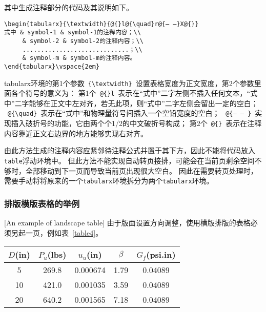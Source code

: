 其中生成注释部分的代码及其说明如下。
\vspace{1em}
\begin{lstlisting}
\begin{tabularx}{\textwidth}{@{}l@{\quad}r@{— —}X@{}}
式中 & symbol-1 & symbol-1的注释内容；\\
     & symbol-2 & symbol-2的注释内容；\\
     .............................；\\
     & symbol-m & symbol-m的注释内容。
\end{tabularx}\vspace{2em}
\end{lstlisting}


tabularx环境的第1个参数~\verb|{\textwidth}|~设置表格宽度为正文宽度，第2个参数里面各个符号的意义为：
    第1个~\verb|@{}l|~表示在“式中”二字左侧不插入任何文本，“式中”二字能够在正文中左对齐，若无此项，则“式中”二字左侧会留出一定的空白；
   ~\verb|@{\quad}|~表示在“式中”和物理量符号间插入一个空铅宽度的空白；
    ~\verb|@{— — }|~实现插入破折号的功能，它由两个个1/2的中文破折号构成；
    第2个~\verb|@{}|~表示在注释内容靠近正文右边界的地方能够实现右对齐。


由此方法生成的注释内容应紧邻待注释公式并置于其下方，因此不能将代码放入\verb|table|浮动环境中。
但此方法不能实现自动转页接排，可能会在当前页剩余空间不够时，全部移动到下一页而导致当前页出现很大空白。
因此在需要转页处理时，需要手动将将原来的一个\verb|tabularx|环境拆分为两个\verb|tabularx|环境。

\subsubsection{排版横版表格的举例}[An example of landscape table]
由于版面设置方向调整，使用横版排版的表格必须另起一页，例如表~\ref{table4}。

\begin{table}[p]
  \centering
  \begin{sideways}
    \begin{minipage}{\textheight}
      \vspace{0.5em}\centering\wuhao
      \begin{tabular}{ccccc}
        \toprule[1.5pt]
        $D$(in) & $P_u$(lbs) & $u_u$(in) & $\beta$ & $G_f$(psi.in) \\
        \midrule[1pt]
        5       & 269.8      & 0.000674  & 1.79    & 0.04089       \\
        10      & 421.0      & 0.001035  & 3.59    & 0.04089       \\
        20      & 640.2      & 0.001565  & 7.18    & 0.04089       \\
        \bottomrule[1.5pt]
      \end{tabular}
    \end{minipage}
  \end{sideways}
\end{table}

